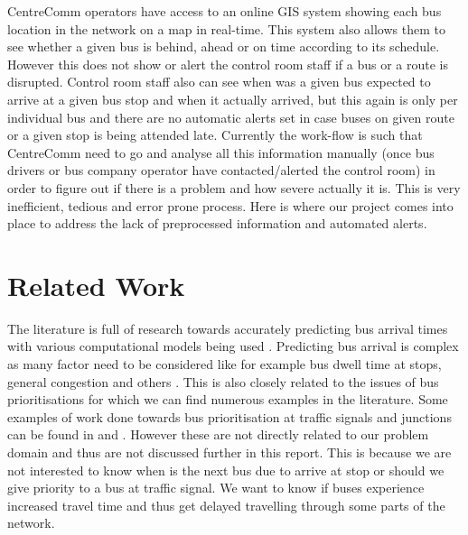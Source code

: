 CentreComm operators have access to an online GIS system showing each bus location in the network on a map in real-time. This system also allows them to see whether a given bus is behind, ahead or on time according to its schedule. However this does not show or alert the control room staff if a bus or a route is disrupted. Control room staff also can see when was a given bus expected to arrive at a given bus stop and when it actually arrived, but this again is only per individual bus and there are no automatic alerts set in case buses on given route or a given stop is being attended late. Currently the work-flow is such that CentreComm need to go and analyse all this information manually (once bus drivers or bus company operator have contacted/alerted the control room) in order to figure out if there is a problem and how severe actually it is. This is very inefficient, tedious and error prone process. Here is where our project comes into place to address the lack of preprocessed information and automated alerts.

\section{Related Work}
The literature is full of research towards accurately predicting bus arrival times with various computational models being used \cite{altinkaya2013urban}. Predicting bus arrival is complex as many factor need to be considered like for example bus dwell time at stops, general congestion and others \cite{jeong2005prediction}. This is also closely related to the issues of bus prioritisations for which we can find numerous examples in the literature. Some examples of work done towards bus prioritisation at traffic signals and junctions can be found in \cite{eps52676} and \cite{clarke2007}. However these are not directly related to our problem domain and thus are not discussed further in this report. This is because we are not interested to know when is the next bus due to arrive at stop or should we give priority to a bus at traffic signal. We want to know if buses experience increased travel time and thus get delayed travelling through some parts of the network. 
 
 

